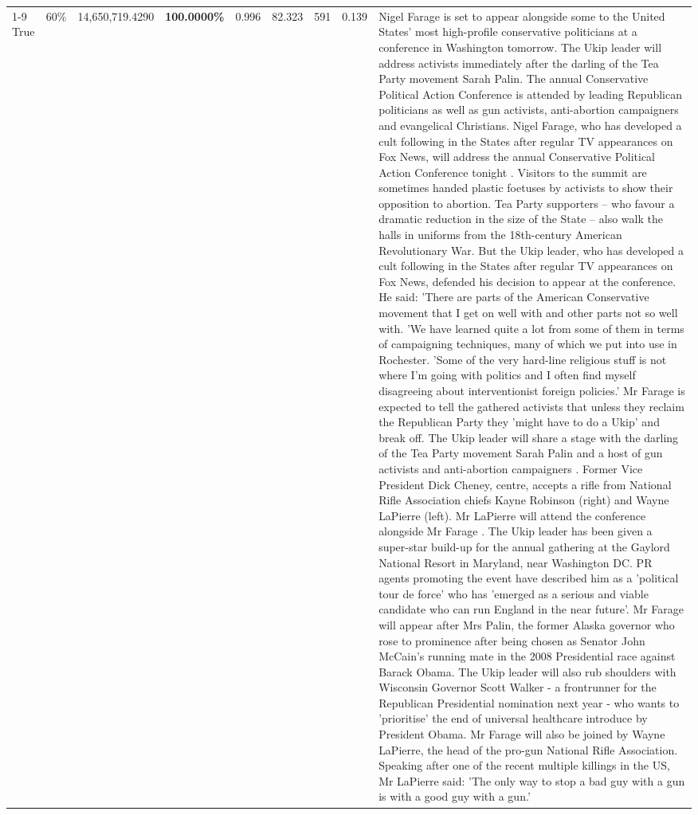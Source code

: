 \begin{table}[H]
\begin{tabular}{lllrlllll}
\cline{1-9} \cline{2-9}
True & 60\% & 14,650,719.4290 & \bfseries \color{red} 100.0000\% & 0.996 & 82.323 & 591 & 0.139 & Nigel Farage is set to appear alongside some to the United States' most high-profile conservative politicians at a conference in Washington tomorrow. The Ukip leader will address activists immediately after the darling of the Tea Party movement Sarah Palin. The annual Conservative Political Action Conference is attended by leading Republican politicians as well as gun activists, anti-abortion campaigners and evangelical Christians. Nigel Farage, who has developed a cult following in the States after regular TV appearances on Fox News, will address the annual Conservative Political Action Conference tonight . Visitors to the summit are sometimes handed plastic foetuses by activists to show their opposition to abortion. Tea Party supporters – who favour a dramatic reduction in the size of the State – also walk the halls in uniforms from the 18th-century American Revolutionary War. But the Ukip leader, who has developed a cult following in the States after regular TV appearances on Fox News, defended his decision to appear at the conference. He said: 'There are parts of the American Conservative movement that I get on well with and other parts not so well with. 'We have learned quite a lot from some of them in terms of campaigning techniques, many of which we put into use in Rochester. 'Some of the very hard-line religious stuff is not where I'm going with politics and I often find myself disagreeing about interventionist foreign policies.' Mr Farage is expected to tell the gathered activists that unless they reclaim the Republican Party they 'might have to do a Ukip' and break off. The Ukip leader will share a stage with the darling of the Tea Party movement Sarah Palin and a host of gun activists and anti-abortion campaigners . Former Vice President Dick Cheney, centre, accepts a rifle from National Rifle Association chiefs Kayne Robinson (right) and Wayne LaPierre (left). Mr LaPierre will attend the conference alongside Mr Farage . The Ukip leader has been given a super-star build-up for the annual gathering at the Gaylord National Resort in Maryland, near Washington DC. PR agents promoting the event have described him as a 'political tour de force' who has 'emerged as a serious and viable candidate who can run England in the near future'. Mr Farage will appear after Mrs Palin, the former Alaska governor who rose to prominence after being chosen as Senator John McCain's running mate in the 2008 Presidential race against Barack Obama. The Ukip leader will also rub shoulders with Wisconsin Governor Scott Walker - a frontrunner for the Republican Presidential nomination next year - who wants to 'prioritise' the end of universal healthcare introduce by President Obama. Mr Farage will also be joined by Wayne LaPierre, the head of the pro-gun National Rifle Association. Speaking after one of the recent multiple killings in the US, Mr LaPierre said: 'The only way to stop a bad guy with a gun is with a good guy with a gun.'🫢 \\

\end{tabular}
\end{table}
